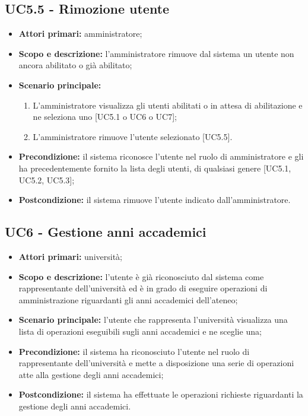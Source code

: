 \documentclass[AnalisiDeiRequisiti.tex]{subfiles}
\begin{document}
\subsection{UC5.5 - Rimozione utente}
\begin{itemize}
	\item \textbf{Attori primari:} amministratore;
	\item \textbf{Scopo e descrizione:} l'amministratore rimuove dal sistema un utente non ancora abilitato o già abilitato;
	\item \textbf{Scenario principale:}
	\begin{enumerate}
		\item L'amministratore visualizza gli utenti abilitati o in attesa di abilitazione e ne seleziona uno [UC5.1 o UC6 o UC7];
		\item L'amministratore rimuove l'utente selezionato [UC5.5].
	\end{enumerate}
	\item \textbf{Precondizione:} il sistema riconosce l'utente nel ruolo di amministratore e gli ha precedentemente fornito la lista degli utenti, di qualsiasi genere [UC5.1, UC5.2, UC5.3];
	\item \textbf{Postcondizione:} il sistema rimuove l'utente indicato dall'amministratore.
\end{itemize}

\subsection{UC6 - Gestione anni accademici}
\begin{itemize}
	\item \textbf{Attori primari:} università;
	\item \textbf{Scopo e descrizione:} l'utente è già riconosciuto dal sistema come rappresentante dell'università ed è in grado di eseguire operazioni di amministrazione riguardanti gli anni accademici dell'ateneo;
	\item \textbf{Scenario principale:} l'utente che rappresenta l'università visualizza una lista di operazioni eseguibili sugli anni accademici e ne sceglie una;
	\item \textbf{Precondizione:} il sistema ha riconosciuto l'utente nel ruolo di rappresentante dell'università e mette a disposizione una serie di operazioni atte alla gestione degli anni accademici; 
	\item \textbf{Postcondizione:} il sistema ha effettuate le operazioni richieste riguardanti la gestione degli anni accademici.
\end{itemize}
\end{document}
